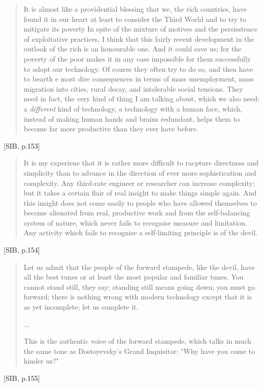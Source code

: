 \begin{quote}
  It is almost like a providential blessing that we, the rich countries, have found it in our heart at least to consider the Third World and to try to mitigate its poverty In spite of the mixture of motives and the persisstence of exploitative practices, I think that this fairly recent development in the outlook of the rich is an honourable one. And it could save us; for the poverty of the poor makes it in any case impossible for them successfully to adopt our technology. Of course they often try to do so, and then have to bearth e most dire consequences in terms of mass unemployment, mass migration into cities, rural decay, and intolerable social tensions. They need in fact, the very kind of thing I am talking about, which we also need: a \textit{different} kind of technology, a technology with a human face, which, instead of making human hands and brains redundant, helps them to become far more productive than they ever have before.
\end{quote}[SIB, p.153]

\begin{quote}
  It is my experiene that it is rather more difficult to racpture directness and simplicity than to advance in the direction of ever more sophistication and complexity. Any third-rate engineer or researcher can increase complexity; but it takes a certain flair of real insight to make things simple again. And this insight does not come easily to people who have allowed themselves to become alienated from real, productive work and from the self-balancing system of nature, which never fails to recognise measure and limitation. Any activity which fails to recognise a self-limiting principle is of the devil.
\end{quote}[SIB, p.154]

\begin{quote}
  Let us admit that the people of the forward stampede, like the devil, have all the best tunes or at least the most popular and familiar tunes. You cannot stand still, they say; standing still means going down; you must go forward; there is nothing wrong with modern technology except that it is as yet incomplete; let us complete it.

  ...

  This is the authentic voice of the forward stampede, which talks in much the same tone as Dostoyevsky's Grand Inquisitor: "Why  have you come to hinder us?"
\end{quote}[SIB, p.155]

